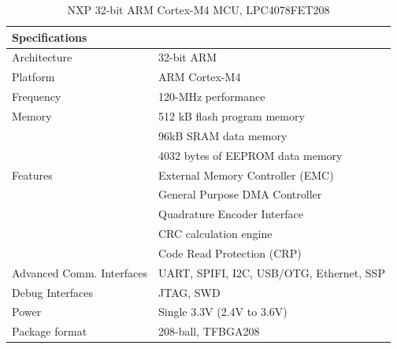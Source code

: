 \begin{table}
    \centering
    \label{table:LPC4078FET208}%
    \caption{NXP 32-bit ARM Cortex-M4 MCU, LPC4078FET208 \autocite{alldatasheet.comLPC4078FET208DatasheetPDF}}
    \begin{tabular}{|p{4cm}|p{12cm}|}
        \hline\rowcolor{gray!30}
    
        \textbf{Specifications} &  \\
        \hline
    
        Architecture & 32-bit ARM \\
        \hline
    
        Platform & ARM Cortex-M4 \\
        \hline
    
        Frequency & 120-MHz performance \\
        \hline
    
        Memory & 512 kB flash program memory \\
         & 96kB SRAM data memory \\
         & 4032 bytes of EEPROM data memory \\
        \hline

        Features & External Memory Controller (EMC) \\
         & General Purpose DMA Controller \\
         & Quadrature Encoder Interface \\
         & CRC calculation engine \\
         & Code Read Protection (CRP) \\
        \hline
    
        Advanced Comm. Interfaces & UART, SPIFI, I2C, USB/OTG, Ethernet, SSP \\
        \hline
    
        Debug Interfaces & JTAG, SWD \\
        \hline

        Power & Single 3.3V (2.4V to 3.6V) \\
        \hline
    
        Package format & 208-ball, TFBGA208 \\
        \hline
    
    \end{tabular}
\end{table}

